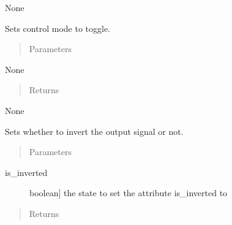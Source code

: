 \documentclass[letterpaper,10pt,english]{sphinxmanual}
\begin{document}
\begin{fulllineitems}
\begin{fulllineitems}
\sphinxAtStartPar
None

\end{fulllineitems}


\begin{fulllineitems}
\label{\detokenize{generic:DigitalOutputObject.DigitalOutputObject.set_control_toggle}}
\sphinxAtStartPar
Sets control mode to toggle.
\begin{quote}\begin{description}
\item[{Parameters}] \leavevmode
\end{description}\end{quote}

\sphinxAtStartPar
None
\begin{quote}\begin{description}
\item[{Returns}] \leavevmode
\end{description}\end{quote}

\sphinxAtStartPar
None

\end{fulllineitems}


\begin{fulllineitems}
\label{\detokenize{generic:DigitalOutputObject.DigitalOutputObject.set_inversion}}
\sphinxAtStartPar
Sets whether to invert the output signal or not.
\begin{quote}\begin{description}
\item[{Parameters}] \leavevmode
\end{description}\end{quote}
\begin{description}
\item[{is\_inverted}] \leavevmode{[}boolean{]}
\sphinxAtStartPar
the state to set the attribute is\_inverted to

\end{description}
\begin{quote}\begin{description}
\item[{Returns}] \leavevmode
\end{description}\end{quote}


\end{fulllineitems}
\end{fulllineitems}
\end{document}
